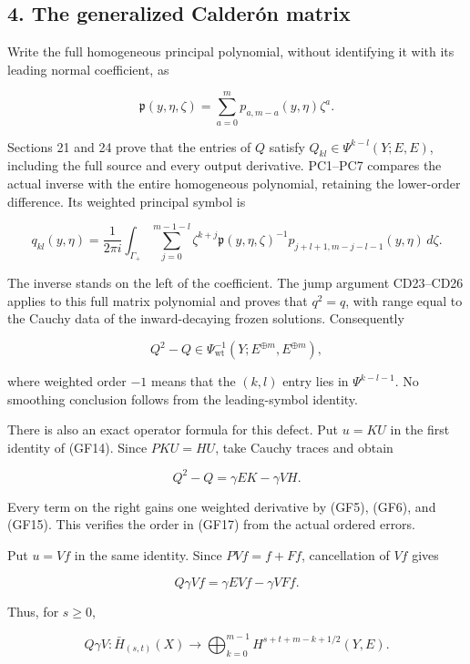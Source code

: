 \documentclass[
  11pt,
]{article}
\begin{document}
\subsection{4. The generalized Calderón
matrix}\label{the-generalized-calderuxf3n-matrix}

Write the full homogeneous principal polynomial, without identifying it
with its leading normal coefficient, as

\[
 \mathfrak p(y,\eta,\zeta)
 =\sum_{a=0}^{m}p_{a,m-a}(y,\eta)\zeta^a.
 \tag{GF16a}
\]

Sections 21 and 24 prove that the entries of \(Q\) satisfy
\(Q_{kl}\in\Psi^{k-l}(Y;E,E)\), including the full source and every
output derivative. PC1--PC7 compares the actual inverse with the entire
homogeneous polynomial, retaining the lower-order difference. Its
weighted principal symbol is

\[
 q_{kl}(y,\eta)=\frac1{2\pi i}\int_{\Gamma_+}
 \sum_{j=0}^{m-1-l}\zeta^{k+j}
 \mathfrak p(y,\eta,\zeta)^{-1}
 p_{j+l+1,m-j-l-1}(y,\eta)\,d\zeta.
 \tag{GF16}
\]

The inverse stands on the left of the coefficient. The jump argument
CD23--CD26 applies to this full matrix polynomial and proves that
\(q^2=q\), with range equal to the Cauchy data of the inward-decaying
frozen solutions. Consequently

\[
 Q^2-Q\in\Psi^{-1}_{\mathrm{wt}}(Y;E^{\oplus m},E^{\oplus m}),
 \tag{GF17}
\]

where weighted order \(-1\) means that the \((k,l)\) entry lies in
\(\Psi^{k-l-1}\). No smoothing conclusion follows from the
leading-symbol identity.

There is also an exact operator formula for this defect. Put \(u=KU\) in
the first identity of (GF14). Since \(PKU=HU\), take Cauchy traces and
obtain

\[
 Q^2-Q=\gamma E K-\gamma V H.
 \tag{GF18}
\]

Every term on the right gains one weighted derivative by (GF5), (GF6),
and (GF15). This verifies the order in (GF17) from the actual ordered
errors.

Put \(u=Vf\) in the same identity. Since \(PVf=f+Ff\), cancellation of
\(Vf\) gives

\[
 Q\gamma Vf=\gamma E Vf-\gamma V Ff.
 \tag{GF19}
\]

Thus, for \(s\geq0\),

\[
 Q\gamma V:\bar H_{(s,t)}(X)\longrightarrow
 \bigoplus_{k=0}^{m-1}H^{s+t+m-k+1/2}(Y,E).
 \tag{GF20}
\]
\end{document}
